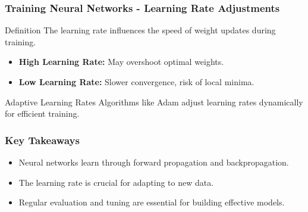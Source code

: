 \documentclass[aspectratio=169]{beamer}
\begin{document}
\begin{frame}[fragile]
    \frametitle{Training Neural Networks - Learning Rate Adjustments}
    \begin{block}{Definition}
        The learning rate influences the speed of weight updates during training.
    \end{block}

    \begin{itemize}
        \item \textbf{High Learning Rate:} May overshoot optimal weights.
        \item \textbf{Low Learning Rate:} Slower convergence, risk of local minima.
    \end{itemize}

    \begin{block}{Adaptive Learning Rates}
        Algorithms like Adam adjust learning rates dynamically for efficient training.
    \end{block}
\end{frame}

\begin{frame}[fragile]
    \frametitle{Key Takeaways}
    \begin{itemize}
        \item Neural networks learn through forward propagation and backpropagation.
        \item The learning rate is crucial for adapting to new data.
        \item Regular evaluation and tuning are essential for building effective models.
    \end{itemize}
\end{frame}
\end{document}
